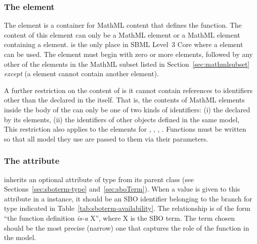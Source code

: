 \subsubsection{The  element}
\label{sec:function-definition-math}

The  element is a container for MathML content that
defines the function.  The content of this element can only be a
MathML  element or a MathML 
element containing a  element.  \FunctionDefinition
is the only place in SBML Level~3 Core where a 
element can be used.  The  element must begin with
zero or more  elements, followed by any other of the
elements in the MathML subset listed in
Section~\ref{sec:mathmlsubset} \emph{except}  (\ie a
 element cannot contain another 
element).

A further restriction on the content of  is it cannot
contain references to identifiers other than the
 declared in the  itself.  That
is, the contents of MathML  elements inside the body of
the  can only be one of two kinds of
  identifiers: (i) the  declared by its 
  elements, (ii) the identifiers of other
\FunctionDefinition objects defined in the same model,
This
restriction also applies to the  elements for
, , , .
Functions must be written so that all model  they use are
passed to them via their parameters.


\subsubsection{The  attribute}
\label{sec:functiondefinition-sboterm}

\FunctionDefinition inherits an optional 
attribute of type  from its parent
class \SBase (see Sections~\ref{sec:sboterm-type}
and~\ref{sec:sboTerm}).  When a value is given to this
attribute in a \FunctionDefinition instance, it should be an
SBO identifier belonging to the branch for type \FunctionDefinition 
indicated in Table~\ref{tab:sboterm-availability}.  The relationship is
of the form ``the function definition \emph{is-a} X'', where X is
the SBO term.  The term chosen should be the most precise (narrow)
one that captures the role of the function in the model.

